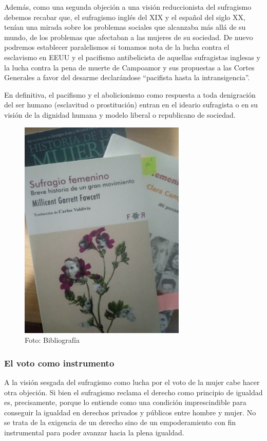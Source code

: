 \documentclass[
]{article}
\begin{document}
Además, como una segunda objeción a una visión reduccionista del
sufragismo debemos recabar que, el sufragismo inglés del XIX y el
español del siglo XX, tenían una mirada sobre los problemas sociales que
alcanzaba más allá de su mundo, de los problemas que afectaban a las
mujeres de su sociedad. De nuevo podremos establecer paralelismos si
tomamos nota de la lucha contra el esclavismo en EEUU y el pacifismo
antibelicista de aquellas sufragistas inglesas y la lucha contra la pena
de muerte de Campoamor y sus propuestas a las Cortes Generales a favor
del desarme declarándose ``pacifista hasta la intransigencia''.

En definitiva, el pacifismo y el abolicionismo como respuesta a toda
denigración del ser humano (esclavitud o prostitución) entran en el
ideario sufragista o en su visión de la dignidad humana y modelo liberal
o republicano de sociedad.

\begin{figure}
\centering
\includegraphics[width=3.125in,height=\textheight]{png/Fuentes.jpg}
\caption{Foto: Bibliografía}
\end{figure}

\hypertarget{el-voto-como-instrumento}{%
\subsubsection{El voto como
instrumento}\label{el-voto-como-instrumento}}

A la visión sesgada del sufragismo como lucha por el voto de la mujer
cabe hacer otra objeción. Si bien el sufragismo reclama el derecho como
principio de igualdad es, precisamente, porque lo entiende como una
condición imprescindible para conseguir la igualdad en derechos privados
y públicos entre hombre y mujer. No se trata de la exigencia de un
derecho sino de un empoderamiento con fin instrumental para poder
avanzar hacia la plena igualdad.
\end{document}
